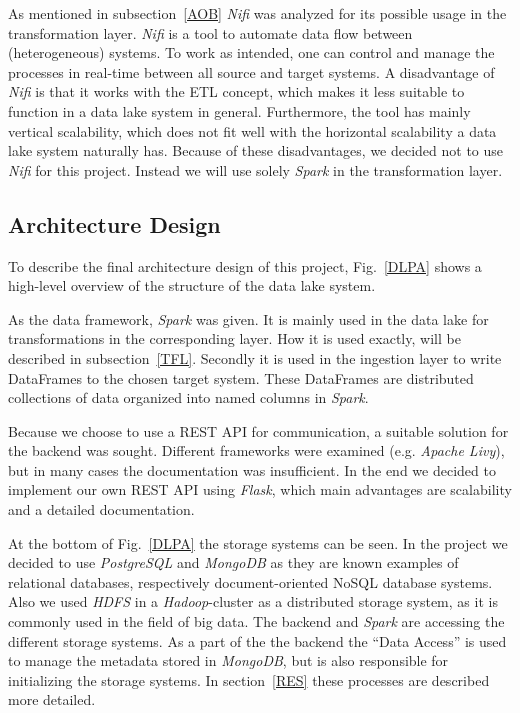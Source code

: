 \documentclass[conference]{IEEEtran}
\begin{document}
As mentioned in subsection~\ref{AOB} \textit{Nifi} was analyzed for its possible usage in the 
transformation layer. 
\textit{Nifi} is a tool to automate data flow between (heterogeneous) systems. 
To work as intended, one can control and manage the processes in real-time between all source
and target systems.
A disadvantage of \textit{Nifi} is that it works with the ETL concept, which makes it less suitable
to function in a data lake system in general.
Furthermore, the tool has mainly vertical scalability, which does not fit well with the horizontal
scalability a data lake system naturally has.
Because of these disadvantages, we decided not to use \textit{Nifi} for this project.
Instead we will use solely \textit{Spark} in the transformation layer.

\subsection{Architecture Design}\label{ADN}
To describe the final architecture design of this project, Fig.~\ref{DLPA} shows a high-level 
overview of the structure of the data lake system.

As the data framework, \textit{Spark} was given. 
It is mainly used in the data lake for transformations in the corresponding layer. 
How it is used exactly, will be described in subsection~\ref{TFL}.
Secondly it is used in the ingestion layer to write DataFrames to the chosen target system.
These DataFrames are distributed collections of data organized into named columns in \textit{Spark}.

Because we choose to use a REST API for communication, a suitable solution for the backend was 
sought.
Different frameworks were examined (e.g. \textit{Apache Livy}), but in many cases the documentation
was insufficient.
In the end we decided to implement our own REST API using \textit{Flask}, which main advantages are 
scalability and a detailed documentation. 

At the bottom of Fig.~\ref{DLPA} the storage systems can be seen.
In the project we decided to use \textit{PostgreSQL} and \textit{MongoDB} as they are known examples of relational 
databases, respectively document-oriented NoSQL database systems.
Also we used \textit{HDFS} in a \textit{Hadoop}-cluster as a distributed storage system, as
it is commonly used in the field of big data.
The backend and \textit{Spark} are accessing the different storage systems.
As a part of the the backend the ``Data Access'' is used to manage the metadata stored in 
\textit{MongoDB}, but is also responsible for initializing the storage systems.
In section~\ref{RES} these processes are described more detailed.
\end{document}
